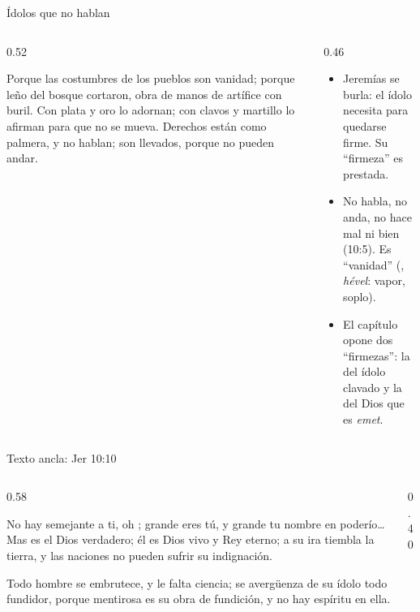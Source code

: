 \begin{frame}{Ídolos que no hablan}
\begin{columns}[t,onlytextwidth]
\begin{column}{0.52\textwidth}
\begin{cita}Porque las costumbres de los pueblos son vanidad; porque leño del bosque cortaron, obra de manos de artífice con buril. Con plata y oro lo adornan; con clavos y martillo lo afirman para que no se mueva. Derechos están como palmera, y no hablan; son llevados, porque no pueden andar.\end{cita}
\end{column}
\begin{column}{0.46\textwidth}\small
\begin{itemize}
\item Jeremías se burla: el ídolo necesita  para quedarse firme. Su ``firmeza'' es prestada.
\item No habla, no anda, no hace mal ni bien (10:5). Es ``vanidad'' (, \emph{hével}: vapor, soplo).
\item El capítulo opone dos ``firmezas'': la del ídolo clavado y la del Dios que es \emph{emet}.
\end{itemize}
\end{column}
\end{columns}
\end{frame}

\begin{frame}{Texto ancla: Jer 10:10}
\begin{columns}[c,onlytextwidth]
\begin{column}{0.58\textwidth}
\begin{cita}No hay semejante a ti, oh \SENOR{}; grande eres tú, y grande tu nombre en poderío\ldots{} Mas \SENOR{} es el Dios verdadero; él es Dios vivo y Rey eterno; a su ira tiembla la tierra, y las naciones no pueden sufrir su indignación.\end{cita}
\begin{cita}Todo hombre se embrutece, y le falta ciencia; se avergüenza de su ídolo todo fundidor, porque mentirosa es su obra de fundición, y no hay espíritu en ella.\end{cita}
\end{column}
\begin{column}{0.40\textwidth}\end{column}
\end{columns}
\end{frame}


